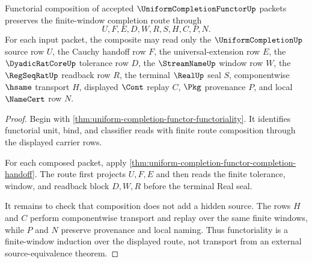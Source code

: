 \begin{theorem}
\label{thm:uniform-completion-functor-window-functoriality}
Functorial composition of accepted $\UniformCompletionFunctorUp$ packets preserves the finite-window completion route through
$$
U,F,E,D,W,R,S,H,C,P,N .
$$
For each input packet, the composite may read only the $\UniformCompletionUp$ source row $U$, the Cauchy handoff row $F$, the universal-extension row $E$, the $\DyadicRatCoreUp$ tolerance row $D$, the $\StreamNameUp$ window row $W$, the $\RegSeqRatUp$ readback row $R$, the terminal $\RealUp$ seal $S$, componentwise $\hsame$ transport $H$, displayed $\Cont$ replay $C$, $\Pkg$ provenance $P$, and local $\NameCert$ row $N$.
\end{theorem}
\begin{proof}
Begin with \autoref{thm:uniform-completion-functor-functoriality}. It identifies functorial unit, bind, and classifier reads with finite route composition through the displayed carrier rows.

For each composed packet, apply \autoref{thm:uniform-completion-functor-completion-handoff}. The route first projects $U,F,E$ and then reads the finite tolerance, window, and readback block $D,W,R$ before the terminal Real seal.

It remains to check that composition does not add a hidden source. The rows $H$ and $C$ perform componentwise transport and replay over the same finite windows, while $P$ and $N$ preserve provenance and local naming. Thus functoriality is a finite-window induction over the displayed route, not transport from an external source-equivalence theorem.
\end{proof}

